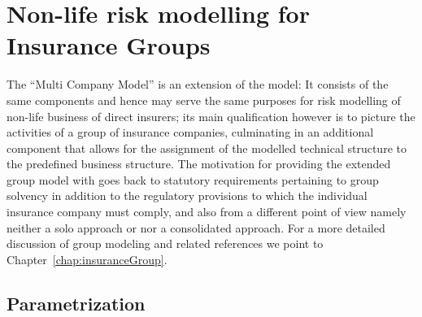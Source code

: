 \chapter[Risk Modelling for Insurance Groups]{Non-life risk modelling for Insurance Groups}
\label{chap:multiCompany}

The ``Multi Company Model'' is an extension of the \PODRA{} model: It consists of the same components and hence may serve the same purposes for risk modelling of non-life business of direct insurers; its main qualification however is to picture the activities of a group of insurance companies, culminating in an additional component that allows for the assignment of the modelled technical structure to the predefined business structure. The motivation for providing the extended group model with \RA{} goes back to statutory requirements pertaining to group solvency in addition to the regulatory provisions to which the individual insurance company must comply, and also from a different point of view namely neither a solo approach or nor a consolidated approach.
For a more detailed discussion of group modeling and related references we point to Chapter~\ref{chap:insuranceGroup}.

\section*{Parametrization}

